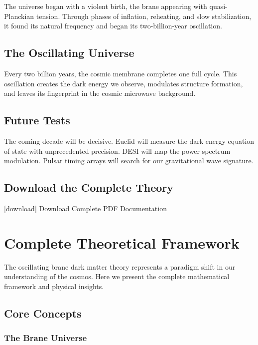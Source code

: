 \documentclass[
  11pt,
]{report}
\begin{document}
The universe began with a violent birth, the brane appearing with
quasi-Planckian tension. Through phases of inflation, reheating, and
slow stabilization, it found its natural frequency and began its
two-billion-year oscillation.

\section{The Oscillating Universe}\label{the-oscillating-universe}

Every two billion years, the cosmic membrane completes one full cycle.
This oscillation creates the dark energy we observe, modulates structure
formation, and leaves its fingerprint in the cosmic microwave
background.

\section{Future Tests}\label{future-tests}

The coming decade will be decisive. Euclid will measure the dark energy
equation of state with unprecedented precision. DESI will map the power
spectrum modulation. Pulsar timing arrays will search for our
gravitational wave signature.

\section{Download the Complete
Theory}\label{download-the-complete-theory}

{[}download{]} Download Complete PDF Documentation

\newpage

\chapter{Complete Theoretical
Framework}\label{complete-theoretical-framework}

The oscillating brane dark matter theory represents a paradigm shift in
our understanding of the cosmos. Here we present the complete
mathematical framework and physical insights.

\section{Core Concepts}\label{core-concepts}

\subsection{The Brane Universe}\label{the-brane-universe}
\end{document}
